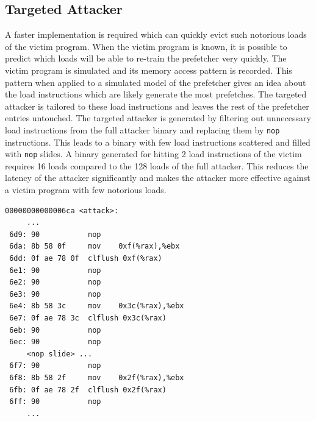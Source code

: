 \documentclass[conference]{IEEEtran}
\begin{document}
\subsection{Targeted Attacker} \label{sec:identify-loads}

A faster implementation is required which can quickly evict such notorious loads
of the victim program.
When the victim program is known, it is possible to predict which loads will
be able to re-train the prefetcher very quickly. The victim program
is simulated and its memory access pattern is recorded. This pattern when
applied to a simulated model of the prefetcher gives an idea about the
load instructions which are likely generate the most prefetches.
The targeted attacker is tailored to these load instructions and leaves
the rest of the prefetcher entries untouched.
The targeted attacker is generated by filtering out unnecessary load instructions
from the full attacker binary and replacing them by \texttt{nop} instructions.
This leads to a binary with few load instructions scattered and filled with \texttt{nop}
slides.
A binary generated for hitting 2 load instructions of the victim requires
16 loads compared to the 128 loads of the full attacker. This reduces the
latency of the attacker significantly and makes the attacker
more effective against a victim program with few notorious loads.

\begin{lstlisting}[caption={Targeted attacker disassembly: loads at aliased PCs},
label={lst:targeted_attack}]
00000000000006ca <attack>:
     ...
 6d9: 90           nop
 6da: 8b 58 0f     mov    0xf(%rax),%ebx
 6dd: 0f ae 78 0f  clflush 0xf(%rax)
 6e1: 90           nop
 6e2: 90           nop
 6e3: 90           nop
 6e4: 8b 58 3c     mov    0x3c(%rax),%ebx
 6e7: 0f ae 78 3c  clflush 0x3c(%rax)
 6eb: 90           nop
 6ec: 90           nop
     <nop slide> ...
 6f7: 90           nop
 6f8: 8b 58 2f     mov    0x2f(%rax),%ebx
 6fb: 0f ae 78 2f  clflush 0x2f(%rax)
 6ff: 90           nop
     ...
\end{lstlisting}
\end{document}

